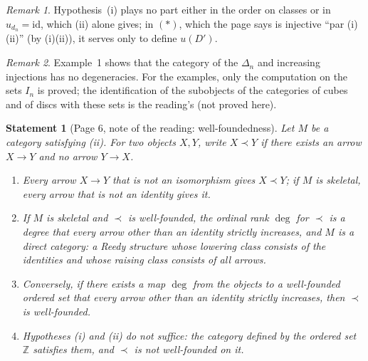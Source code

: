 \documentclass[11pt]{article}
\newcommand{\q}[1]{“#1”}
\newcommand{\fr}[1]{\textfrench{#1}}
\theoremstyle{plain}
\newtheorem*{enonce}{Statement}
\theoremstyle{definition}
\theoremstyle{remark}
\newtheorem*{remarque}{Remark}
\begin{document}
\begin{remarque}
Hypothesis~(i) plays no part either in the order on classes or in $u_{d_n} = \mathrm{id}$, which (ii) alone gives; in $(*)$, which the page says is injective \q{\fr{par (i)(ii)}} (by (i)(ii)), it serves only to define $u(D')$.
\end{remarque}

\begin{remarque}
Example~1 shows that the category of the $\Delta_n$ and increasing injections has no degeneracies. For the examples, only the computation on the sets $I_n$ is proved; the identification of the subobjects of the categories of cubes and of discs with these sets is the reading's (not proved here).
\end{remarque}

\begin{enonce}[Page 6, note of the reading: well-foundedness]
Let $M$ be a category satisfying (ii). For two objects $X, Y$, write $X \prec Y$ if there exists an arrow $X \to Y$ and no arrow $Y \to X$.
\begin{enumerate}
\item Every arrow $X \to Y$ that is not an isomorphism gives $X \prec Y$; if $M$ is skeletal, every arrow that is not an identity gives it.
\item If $M$ is skeletal and $\prec$ is well-founded, the ordinal rank $\deg$ for $\prec$ is a degree that every arrow other than an identity strictly increases, and $M$ is a direct category: a Reedy structure whose lowering class consists of the identities and whose raising class consists of all arrows.
\item Conversely, if there exists a map $\deg$ from the objects to a well-founded ordered set that every arrow other than an identity strictly increases, then $\prec$ is well-founded.
\item Hypotheses (i) and (ii) do not suffice: the category defined by the ordered set $\mathbb Z$ satisfies them, and $\prec$ is not well-founded on it.
\end{enumerate}
\end{enonce}
\end{document}
